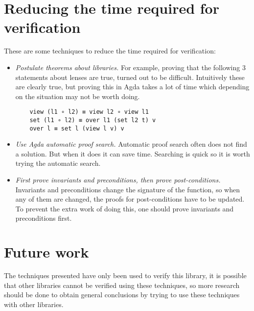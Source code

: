 \section{Reducing the time required for verification} \label{reduce_time}
These are some techniques to reduce the time required for verification:
\begin{itemize}
    \item \textit{Postulate theorems about libraries.} For example, proving that the following 3 statements about lenses are true, turned out to be difficult. Intuitively these are clearly true, but proving this in Agda takes a lot of time which depending on the situation may not be worth doing. 
    \begin{verbatim}
    view (l1 ∘ l2) ≡ view l2 ∘ view l1
    set (l1 ∘ l2) ≡ over l1 (set l2 t) v
    over l ≡ set l (view l v) v
    \end{verbatim}
    \item \textit{Use Agda automatic proof search.} Automatic proof search often does not find a solution. But when it does it can save time. Searching is quick so it is worth trying the automatic search.
    \item \textit{First prove invariants and preconditions, then prove post-conditions.} Invariants and preconditions change the signature of the function, so when any of them are changed, the proofs for post-conditions have to be updated. To prevent the extra work of doing this, one should prove invariants and preconditions first.
\end{itemize}

\section{Future work}
The techniques presented have only been used to verify this library, it is possible that other libraries cannot be verified using these techniques, so more research should be done to obtain general conclusions by trying to use these techniques with other libraries. 

